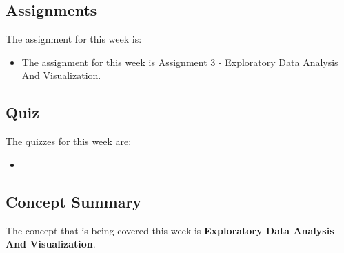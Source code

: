 \subsection{Assignments}

The assignment for this week is:

\begin{itemize}
    \item The assignment for this week is \href{https://github.com/QuantumCompiler/CU/tree/main/CSPB%203022%20-%20Introduction%20To%20Data%20Science%20With%20Probability%20And%20Statistics/CSPB%203022%20-%20Assignments/CSPB%203022%20-%20Assignment%203%20-%20Exploratory%20Data%20Analysis%20And%20Visualization}{Assignment 3 - Exploratory Data Analysis And Visualization}. 
\end{itemize}

\subsection{Quiz}

The quizzes for this week are:

\begin{itemize}
    \item {} \textbullet {} 
\end{itemize}

\subsection{Concept Summary}

The concept that is being covered this week is \textbf{Exploratory Data Analysis And Visualization}.

